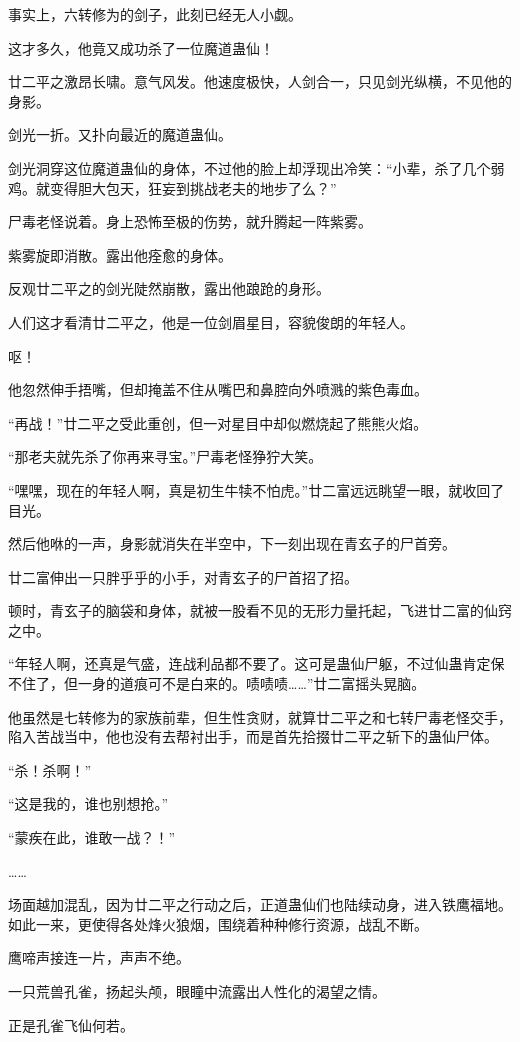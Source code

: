 \begin{this_body}
事实上，六转修为的剑子，此刻已经无人小觑。

这才多久，他竟又成功杀了一位魔道蛊仙！

廿二平之激昂长啸。意气风发。他速度极快，人剑合一，只见剑光纵横，不见他的身影。

剑光一折。又扑向最近的魔道蛊仙。

剑光洞穿这位魔道蛊仙的身体，不过他的脸上却浮现出冷笑：“小辈，杀了几个弱鸡。就变得胆大包天，狂妄到挑战老夫的地步了么？”

尸毒老怪说着。身上恐怖至极的伤势，就升腾起一阵紫雾。

紫雾旋即消散。露出他痊愈的身体。

反观廿二平之的剑光陡然崩散，露出他踉跄的身形。

人们这才看清廿二平之，他是一位剑眉星目，容貌俊朗的年轻人。

呕！

他忽然伸手捂嘴，但却掩盖不住从嘴巴和鼻腔向外喷溅的紫色毒血。

“再战！”廿二平之受此重创，但一对星目中却似燃烧起了熊熊火焰。

“那老夫就先杀了你再来寻宝。”尸毒老怪狰狞大笑。

“嘿嘿，现在的年轻人啊，真是初生牛犊不怕虎。”廿二富远远眺望一眼，就收回了目光。

然后他咻的一声，身影就消失在半空中，下一刻出现在青玄子的尸首旁。

廿二富伸出一只胖乎乎的小手，对青玄子的尸首招了招。

顿时，青玄子的脑袋和身体，就被一股看不见的无形力量托起，飞进廿二富的仙窍之中。

“年轻人啊，还真是气盛，连战利品都不要了。这可是蛊仙尸躯，不过仙蛊肯定保不住了，但一身的道痕可不是白来的。啧啧啧……”廿二富摇头晃脑。

他虽然是七转修为的家族前辈，但生性贪财，就算廿二平之和七转尸毒老怪交手，陷入苦战当中，他也没有去帮衬出手，而是首先拾掇廿二平之斩下的蛊仙尸体。

“杀！杀啊！”

“这是我的，谁也别想抢。”

“蒙疾在此，谁敢一战？！”

……

场面越加混乱，因为廿二平之行动之后，正道蛊仙们也陆续动身，进入铁鹰福地。如此一来，更使得各处烽火狼烟，围绕着种种修行资源，战乱不断。

鹰啼声接连一片，声声不绝。

一只荒兽孔雀，扬起头颅，眼瞳中流露出人性化的渴望之情。

正是孔雀飞仙何若。


\end{this_body}
